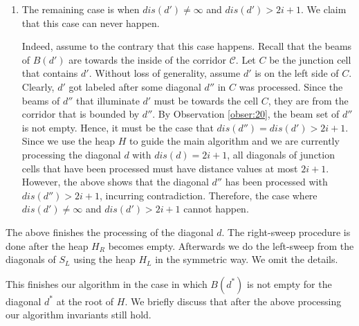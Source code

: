 \documentclass[english,runningheads,11pt]{llncs-revised}
\def\calC{\mathcal{C}}
\begin{document}
\begin{enumerate}
\item
The remaining case is when $dis(d')\neq \infty$ and $dis(d')>2i+1$.
We claim that this case can never happen.

Indeed, assume to the contrary that this case happens. Recall that the beams of $B(d')$ are towards the inside of the corridor $\calC$. Let $C$ be the junction cell that contains $d'$. Without loss of generality, assume $d'$ is on the left side of $C$.
Clearly, $d'$ got labeled after some diagonal $d''$ in $C$ was processed.
Since the beams of $d''$ that illuminate $d'$ must be towards the cell $C$, they
are from the corridor that is bounded by $d''$. By Observation
\ref{obser:20}, the beam set of $d''$ is not empty. Hence, it must be
the case that $dis(d'')=dis(d')>2i+1$. Since we use the heap $H$ to guide the main algorithm and we are currently processing the diagonal $d$ with $dis(d)=2i+1$, all diagonals of junction cells that have been processed must have distance values at most $2i+1$. However, the above shows that the diagonal $d''$
has been processed with $dis(d'')>2i+1$, incurring contradiction. Therefore, the case where $dis(d')\neq \infty$ and
$dis(d')>2i+1$ cannot happen.
\end{enumerate}

The above finishes the processing of the diagonal $d$. The
right-sweep procedure is done after the heap $H_R$ becomes empty.
Afterwards we do the left-sweep from the diagonals of $S_L$ using the heap $H_L$ in the
symmetric way. We omit the details.

This finishes our algorithm in the case in which $B(d^*)$ is not empty
for the diagonal $d^*$ at the root of $H$. We briefly discuss that
after the above processing our algorithm invariants still hold.
\end{document}
